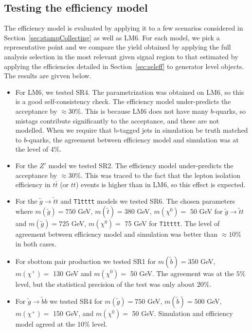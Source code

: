 \subsection{Testing the efficiency model}
\label{sec:outreachtest}


The efficiency model is evaluated by applying it to a few 
scenarios considered in Section~\ref{sec:stampCollecting} as
well as LM6.   
For each model, we pick a representative point
and we compare the
yield obtained by applying the full analysis selection 
in the most relevant given signal region 
to that estimated by applying the efficiencies detailed in 
Section~\ref{sec:seleff} to generator level objects.  
The results are givven below.

\begin{itemize}

\item For LM6, we tested SR4.  The parametrization was obtained on
LM6, so this is a good self-consistency check.  The efficiency
model under-predicts the acceptance by $\approx 30\%$.  This is because LM6
does not have many $b$-quarks, so mistags contribute 
significantly to the acceptance, and these are not modelled. 
When we require that b-tagged jets in simulation 
be truth matched to $b$-quarks, the agreement between 
efficiency model and simulation was at the level of 4\%.

\item For the $Z'$ model we tested SR2.  The efficiency model 
under-predicts the acceptance by $\approx 30\%$.  This was traced to 
the fact that the lepton isolation efficiency in $t\bar{t}$ (or $tt$)
events is higher than in LM6, so this effect is expected.

\item For the $\tilde{g} \to \tilde{t}t$ and {\tt T1tttt} 
models we tested SR6.
The chosen parameters where $m(\tilde{g}) = 750$ GeV, 
$m(\tilde{t}) = 380$ GeV, $m(\chi^0)=$ 50 GeV for  
$\tilde{g} \to \tilde{t}t$ and $m(\tilde{g}) = 725$ GeV, 
$m(\chi^0)=$ 75 GeV for {\tt T1tttt}.  The level 
of agreement between efficiency model and simulation was 
better than $\approx 10\%$ in both cases.

\item For sbottom pair production we tested SR1 for
$m(\tilde{b}) = 350$ GeV, $m(\chi^+)=$ 130 GeV and
$m(\chi^0)=$ 50 GeV.  The agreement was at the $5\%$
level, but the statistical precision of the test was only 
about $20\%$.

\item For $\tilde{g} \to \tilde{b}b$ we tested SR4
for $m(\tilde{g}) = 750$ GeV, 
$m(\tilde{b}) = 500$ GeV, $m(\chi^+)=$ 150 GeV, and 
$m(\chi^0)=$ 50 GeV.  Simulation and efficiency model
agreed at the 10\% level.

\end{itemize}

